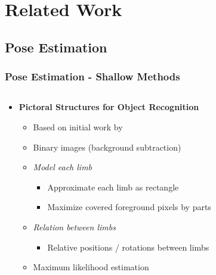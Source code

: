\documentclass[9pt]{beamer}
\newenvironment{myframe}[1][]{%
\begin{frame}%
\frametitle{#1}
\setcounter{footnote}{0}


}{%
\end{frame}%
}
\begin{document}
\section{Related Work}
\subsection{Pose Estimation}

\begin{myframe}[Pose Estimation - Shallow Methods]
    \note[item]{}
    \begin{columns}[T]
        \begin{column}{.48\textwidth}
            \begin{itemize}
                \item \textbf{Pictoral Structures for Object Recognition \footnotemark}
              \begin{itemize}
                  \item Based on initial work by \footnotemark
                  \item Binary images (background subtraction)
                  \item \textit{Model each limb}
                  \begin{itemize}
                      \item Approximate each limb as rectangle
                      \item Maximize covered foreground pixels by parts
                  \end{itemize}
                  \item \textit{Relation between limbs}
                  \begin{itemize}
                      \item Relative positions / rotations between limbs
                  \end{itemize}
                  \item Maximum likelihood estimation

\end{itemize}
\end{itemize}
\end{column}
\end{columns}
\end{myframe}
\end{document}
